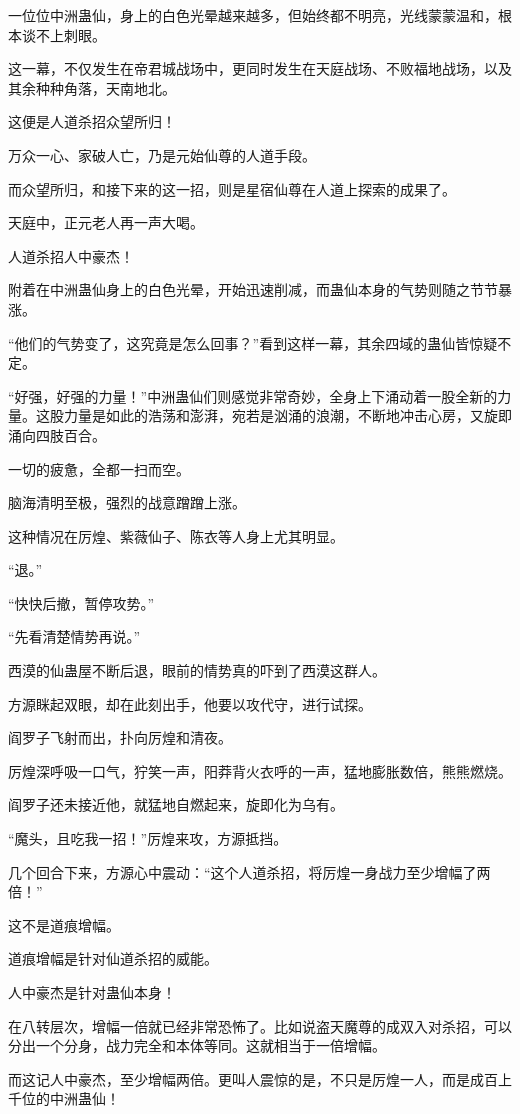 \begin{this_body}
一位位中洲蛊仙，身上的白色光晕越来越多，但始终都不明亮，光线蒙蒙温和，根本谈不上刺眼。

这一幕，不仅发生在帝君城战场中，更同时发生在天庭战场、不败福地战场，以及其余种种角落，天南地北。

这便是人道杀招众望所归！

万众一心、家破人亡，乃是元始仙尊的人道手段。

而众望所归，和接下来的这一招，则是星宿仙尊在人道上探索的成果了。

天庭中，正元老人再一声大喝。

人道杀招人中豪杰！

附着在中洲蛊仙身上的白色光晕，开始迅速削减，而蛊仙本身的气势则随之节节暴涨。

“他们的气势变了，这究竟是怎么回事？”看到这样一幕，其余四域的蛊仙皆惊疑不定。

“好强，好强的力量！”中洲蛊仙们则感觉非常奇妙，全身上下涌动着一股全新的力量。这股力量是如此的浩荡和澎湃，宛若是汹涌的浪潮，不断地冲击心房，又旋即涌向四肢百合。

一切的疲惫，全都一扫而空。

脑海清明至极，强烈的战意蹭蹭上涨。

这种情况在厉煌、紫薇仙子、陈衣等人身上尤其明显。

“退。”

“快快后撤，暂停攻势。”

“先看清楚情势再说。”

西漠的仙蛊屋不断后退，眼前的情势真的吓到了西漠这群人。

方源眯起双眼，却在此刻出手，他要以攻代守，进行试探。

阎罗子飞射而出，扑向厉煌和清夜。

厉煌深呼吸一口气，狞笑一声，阳莽背火衣呼的一声，猛地膨胀数倍，熊熊燃烧。

阎罗子还未接近他，就猛地自燃起来，旋即化为乌有。

“魔头，且吃我一招！”厉煌来攻，方源抵挡。

几个回合下来，方源心中震动：“这个人道杀招，将厉煌一身战力至少增幅了两倍！”

这不是道痕增幅。

道痕增幅是针对仙道杀招的威能。

人中豪杰是针对蛊仙本身！

在八转层次，增幅一倍就已经非常恐怖了。比如说盗天魔尊的成双入对杀招，可以分出一个分身，战力完全和本体等同。这就相当于一倍增幅。

而这记人中豪杰，至少增幅两倍。更叫人震惊的是，不只是厉煌一人，而是成百上千位的中洲蛊仙！


\end{this_body}
